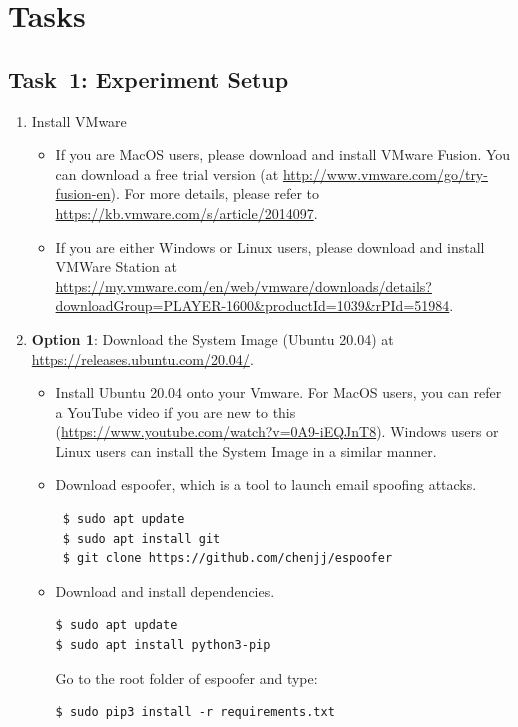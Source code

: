 \documentclass[11pt]{article}
\newcommand{\espoofer}{{\sf espoofer}\xspace}
\begin{document}
 
\section{Tasks}

\subsection{Task~1: Experiment Setup}

 

\begin{enumerate}
\item Install VMware
\begin{itemize}
    \item If you are MacOS users, please download and install VMware Fusion. You can  download a free trial version (at \url{http://www.vmware.com/go/try-fusion-en}). For more details, please refer to \url{https://kb.vmware.com/s/article/2014097}. 
    \item If you are either Windows or Linux users, please download and install VMWare Station at \url{https://my.vmware.com/en/web/vmware/downloads/details?downloadGroup=PLAYER-1600&productId=1039&rPId=51984}.  

\end{itemize}
\item\textbf{Option 1}: Download the System Image (Ubuntu 20.04) at \url{https://releases.ubuntu.com/20.04/}. 

\begin{itemize}
\item Install Ubuntu 20.04 onto your Vmware. For MacOS users, you can refer a YouTube video if you are new to this (\url{https://www.youtube.com/watch?v=0A9-iEQJnT8}). Windows users or Linux users can install the System Image in a similar manner.   
\item Download \espoofer, which is a tool to launch email spoofing attacks. 
\begin{lstlisting}
 $ sudo apt update
 $ sudo apt install git
 $ git clone https://github.com/chenjj/espoofer
\end{lstlisting}\vspace{-6mm}

\item Download and install dependencies. 
\begin{lstlisting}
$ sudo apt update
$ sudo apt install python3-pip
\end{lstlisting}\vspace{-6mm}
Go to the root folder of \espoofer and type:
 \begin{lstlisting}
$ sudo pip3 install -r requirements.txt
\end{lstlisting}\vspace{-6mm}
\end{itemize}




\end{enumerate}
\end{document}
